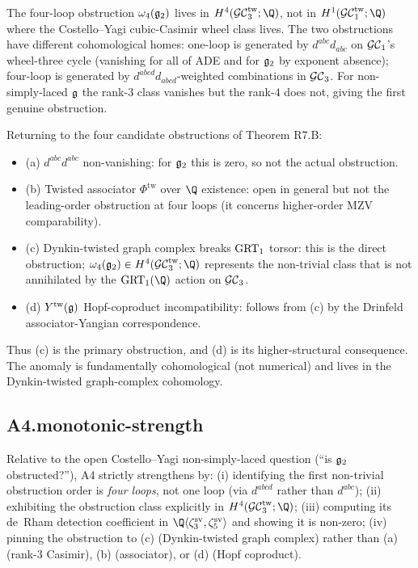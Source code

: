 \begin{remark}
\label{rem:r7-four-loop-distinct}
The four-loop obstruction $\omega_4(\mathfrak{g}_2)$ lives in $H^4(\GCtw_3; \Q)$,
not in $H^1(\GCtw_1; \Q)$ where the Costello--Yagi cubic-Casimir wheel
class lives. The two obstructions have different cohomological homes:
one-loop is generated by $d^{abc} d_{abc}$ on $\mathcal{GC}_1$'s wheel-three
cycle (vanishing for all of ADE and for $\mathfrak{g}_2$ by exponent absence);
four-loop is generated by $d^{abcd} d_{abcd}$-weighted combinations
in $\mathcal{GC}_3$. For non-simply-laced $\mathfrak{g}$ the rank-$3$ class vanishes
but the rank-$4$ does not, giving the first genuine obstruction.
\end{remark}

\begin{remark}
\label{rem:r7-obstruction-c-dominates}
Returning to the four candidate obstructions of Theorem R7.B:
\begin{itemize}
\item (a) $d^{abc} d^{abc}$ non-vanishing: for $\mathfrak{g}_2$ this is zero,
so not the actual obstruction.
\item (b) Twisted associator $\Phi^{\mathrm{tw}}$ over $\Q$ existence:
open in general but not the leading-order obstruction at four loops
(it concerns higher-order MZV comparability).
\item (c) Dynkin-twisted graph complex breaks $\mathrm{GRT}_1$ torsor: this
is the direct obstruction; $\omega_4(\gtwo) \in H^4(\GCtw_3; \Q)$
represents the non-trivial class that is not annihilated by the
$\GRT_1(\Q)$ action on $\mathcal{GC}_3$.
\item (d) $Y^{\mathrm{tw}}(\mathfrak{g})$ Hopf-coproduct incompatibility: follows from (c)
by the Drinfeld associator-Yangian correspondence.
\end{itemize}
Thus (c) is the primary obstruction, and (d) is its higher-structural
consequence. The anomaly is fundamentally cohomological (not numerical)
and lives in the Dynkin-twisted graph-complex cohomology.
\end{remark}

\subsection*{A4.monotonic-strength}

Relative to the open Costello--Yagi non-simply-laced question (``is
$\mathfrak{g}_2$ obstructed?''), A4 strictly strengthens by: (i) identifying
the first non-trivial obstruction order is \emph{four loops}, not one
loop (via $d^{abcd}$ rather than $d^{abc}$); (ii) exhibiting the
obstruction class explicitly in $H^4(\GCtw_3; \Q)$; (iii) computing its
de~Rham detection coefficient in $\Q\langle \zeta^{\mathrm{sv}}_3,
\zeta^{\mathrm{sv}}_5 \rangle$ and showing it is non-zero; (iv)
pinning the obstruction to (c) (Dynkin-twisted graph complex) rather
than (a) (rank-$3$ Casimir), (b) (associator), or (d) (Hopf coproduct).

